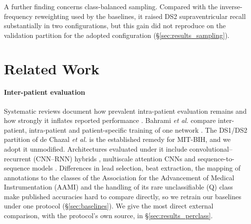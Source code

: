 \documentclass[preprint,12pt]{elsarticle}
\begin{document}
A further finding concerns class-balanced sampling. Compared with the inverse-frequency reweighting used by the baselines, it raised DS2 supraventricular recall substantially in two configurations, but this gain did not reproduce on the validation partition for the adopted configuration (\S\ref{sec:results_sampling}).

\section{Related Work}
\label{sec:related_work}

\paragraph{Inter-patient evaluation} Systematic reviews document how prevalent intra-patient evaluation remains and how strongly it inflates reported performance \cite{xiao_deep_2023, silva_systematic_2025}. Bahrami \emph{et al.} compare inter-patient, intra-patient and patient-specific training of one network \cite{bahrami_investigation_2025}. The DS1/DS2 partition of de Chazal \emph{et al.} \cite{chazal_automatic_2004} is the established remedy for MIT-BIH, and we adopt it unmodified. Architectures evaluated under it include convolutional--recurrent (CNN--RNN) hybrids \cite{guo_inter-patient_2019}, multiscale attention CNNs \cite{zhou_inter-patient_2024} and sequence-to-sequence models \cite{mousavi_inter-_2019}. Differences in lead selection, beat extraction, the mapping of annotations to the classes of the Association for the Advancement of Medical Instrumentation (AAMI) and the handling of its rare unclassifiable (Q) class make published accuracies hard to compare directly, so we retrain our baselines under one protocol (\S\ref{sec:baselines}). We give the most direct external comparison, with the protocol's own source, in \S\ref{sec:results_perclass}.
\end{document}
